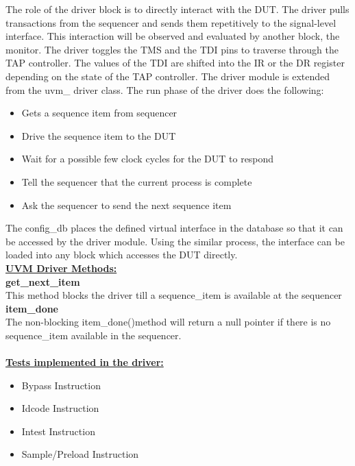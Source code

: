 \documentclass[a4paper,11pt]{article}
\begin{document}
The role of the driver block is to directly interact with the DUT. The driver pulls transactions from the sequencer and sends them repetitively to the signal-level interface. This interaction will be observed and evaluated by another block, the monitor. The driver toggles the TMS and the TDI pins to traverse through the TAP controller. The values of the TDI are shifted into the IR or the DR register depending on the state of the TAP controller. The driver module is extended from the uvm\_ driver class.
The run phase of the driver does the following:

\begin{itemize}[noitemsep]
\item Gets a sequence item from sequencer
\item Drive the sequence item to the DUT
\item Wait for a possible few clock cycles for the DUT to respond
\item Tell the sequencer that the current process is complete
\item Ask the sequencer to send the next sequence item
\end{itemize}

The config\_db places the defined virtual interface in the database so that it can be accessed by the driver module. Using the similar process, the interface can be loaded into any block which accesses the DUT directly.\\

\underline{\textbf{UVM Driver Methods:}}\\
\textbf{get\_next\_item} \\This method blocks the driver till a sequence\_item is available at the sequencer\\
\textbf{item\_done} \\The non-blocking item\_done()method will return a null pointer if there is no sequence\_item available in the sequencer.
\\
 \\
\underline{\textbf{Tests implemented in the driver:}}\\

\begin{itemize}[noitemsep]

\item Bypass Instruction
\item Idcode Instruction
\item Intest Instruction
\item Sample/Preload Instruction

\end{itemize}
\end{document}
